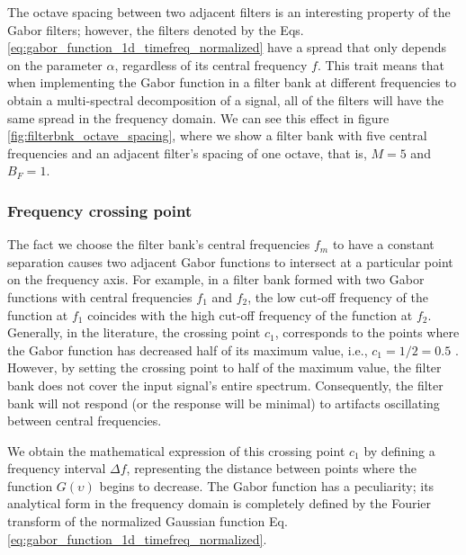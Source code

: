 The octave spacing between two adjacent filters is an interesting property of the Gabor filters; however, the filters denoted by the Eqs. \eqref{eq:gabor_function_1d_timefreq_normalized} have a spread that only depends on the parameter $\alpha$, regardless of its central frequency $f$. This trait means that when implementing the Gabor function in a filter bank at different frequencies to obtain a multi-spectral decomposition of a signal, all of the filters will have the same spread in the frequency domain. We can see this effect in figure \ref{fig:filterbnk_octave_spacing}, where we show a filter bank with five central frequencies and an adjacent filter's spacing of one octave, that is, $M=5$ and $B_F = 1$. 


\subsubsection{Frequency crossing point}
The fact we choose the filter bank's central frequencies $f_m$ to have a constant separation causes two adjacent Gabor functions to intersect at a particular point on the frequency axis. For example, in a filter bank formed with two Gabor functions with central frequencies $f_1$ and $f_2$, the low cut-off frequency of the function at $f_1$ coincides with the high cut-off frequency of the function at $f_2$. Generally, in the literature, the crossing point $c_1$, corresponds to the points where the Gabor function has decreased half of its maximum value, i.e., $c_1= 1/2=0.5$ \citep{Granlund:CGIP:1978}. However, by setting the crossing point to half of the maximum value, the filter bank does not cover the input signal's entire spectrum. Consequently, the filter bank will not respond (or the response will be minimal) to artifacts oscillating between central frequencies.

We obtain the mathematical expression of this crossing point $c_1$ by defining a frequency interval $\Delta f$, representing the distance between points where the function $G(\upsilon)$ begins to decrease. The Gabor function has a peculiarity;  its analytical form in the frequency domain is completely defined by the Fourier transform of the normalized Gaussian function Eq. \eqref{eq:gabor_function_1d_timefreq_normalized}.


